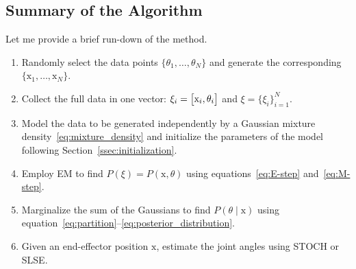 \subsection{Summary of the Algorithm}
%
Let me provide a brief run-down of the method.

\begin{enumerate}
    \setlength\itemsep{0em}
    \item Randomly select the data points $\{\theta_1, \ldots, \theta_N\}$ and
    generate the corresponding $\{\mathrm{x}_1, \ldots, \mathrm{x}_N\}$.
    \item Collect the full data in one vector: $\xi_i = \begin{bmatrix} \mathrm{x}_i,
    \theta_i\end{bmatrix}$ and $\xi = \{\xi_i\}_{i=1}^N$.
    \item Model the data to be generated independently by a Gaussian mixture
    density~\eqref{eq:mixture_density} and initialize the parameters of the
    model following Section~\ref{ssec:initialization}.
    \item Employ EM to find $P(\xi) = P(\mathrm{x}, \theta)$ using
    equations~\eqref{eq:E-step} and~\eqref{eq:M-step}.
    \item Marginalize the sum of the Gaussians to find $P(\theta \mid
    \mathrm{x})$ using
    equation~\eqref{eq:partition}--\eqref{eq:posterior_distribution}.
    \item Given an end-effector position $\mathrm{x}$, estimate the joint angles
    using STOCH or SLSE.
\end{enumerate}